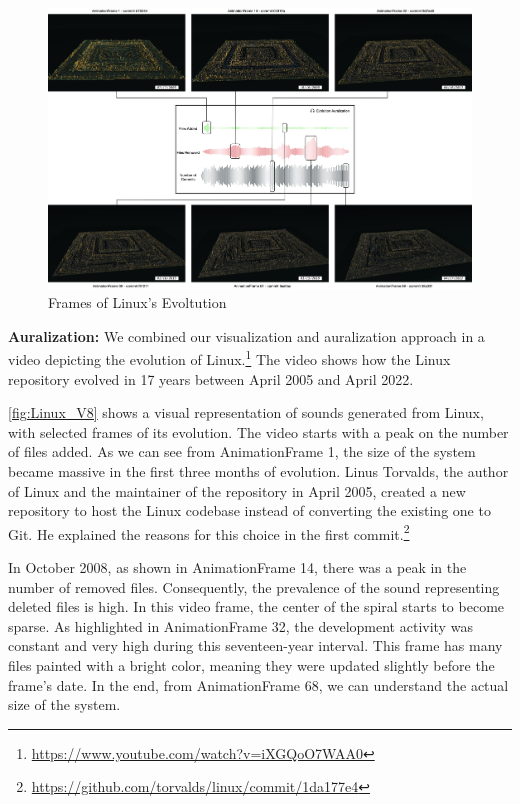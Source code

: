 \begin{landscape}
    \Huge 
    \begin{figure}[ht]
    \includegraphics[width=\linewidth]{LinuxAuralization.jpg}
    \caption{Frames of Linux's Evoltution} 
    \label{fig:Linux_V8}
\end{figure}
\end{landscape}

\newpage
\noindent
\textbf{Auralization:}
We combined our visualization and auralization approach in a video depicting the evolution of Linux.\footnote{\url{https://www.youtube.com/watch?v=iXGQoO7WAA0}} The video shows how the Linux repository evolved in 17 years between April 2005 and April 2022. 

\autoref{fig:Linux_V8} shows a visual representation of sounds generated from Linux, with selected frames of its evolution. The video starts with a peak on the number of files added. As we can see from AnimationFrame 1, the size of the system became massive in the first three months of evolution. Linus Torvalds, the author of Linux and the maintainer of the repository in April 2005, created a new repository to host the Linux codebase instead of converting the existing one to Git. He explained the reasons for this choice in the first commit.\footnote{\url{https://github.com/torvalds/linux/commit/1da177e4}}

In October 2008, as shown in AnimationFrame 14, there was a peak in the number of removed files. Consequently, the prevalence of the sound representing deleted files is high. In this video frame, the center of the spiral starts to become sparse. As highlighted in AnimationFrame 32, the development activity was constant and very high during this 
seventeen-year interval. This frame has many files painted with a bright color, meaning they were updated slightly before the frame's date. 
In the end, from AnimationFrame 68, we can understand the actual size of the system.


